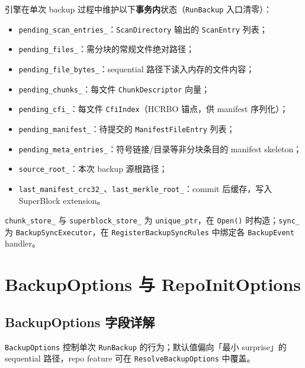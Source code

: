 引擎在单次 backup 过程中维护以下\textbf{事务内}状态（\texttt{RunBackup} 入口清零）：

\begin{structbox}
\begin{itemize}[nosep]
  \item \texttt{pending\_scan\_entries\_}：\texttt{ScanDirectory} 输出的 \texttt{ScanEntry} 列表；
  \item \texttt{pending\_files\_}：需分块的常规文件绝对路径；
  \item \texttt{pending\_file\_bytes\_}：sequential 路径下读入内存的文件内容；
  \item \texttt{pending\_chunks\_}：每文件 \texttt{ChunkDescriptor} 向量；
  \item \texttt{pending\_cfi\_}：每文件 \texttt{CfiIndex}（HCRBO 锚点，供 manifest 序列化）；
  \item \texttt{pending\_manifest\_}：待提交的 \texttt{ManifestFileEntry} 列表；
  \item \texttt{pending\_meta\_entries\_}：符号链接/目录等非分块条目的 manifest skeleton；
  \item \texttt{source\_root\_}：本次 backup 源根路径；
  \item \texttt{last\_manifest\_crc32\_}、\texttt{last\_merkle\_root\_}：commit 后缓存，写入 SuperBlock extension。
\end{itemize}
\end{structbox}

\texttt{chunk\_store\_} 与 \texttt{superblock\_store\_} 为 \texttt{unique\_ptr}，在 \texttt{Open()} 时构造；\texttt{sync\_} 为 \texttt{BackupSyncExecutor}，在 \texttt{RegisterBackupSyncRules} 中绑定各 \texttt{BackupEvent} handler。

\section{BackupOptions 与 RepoInitOptions}
\label{sec:be-options}

\subsection{BackupOptions 字段详解}

\texttt{BackupOptions} 控制单次 \texttt{RunBackup} 的行为；默认值偏向「最小 surprise」的 sequential 路径，repo feature 可在 \texttt{ResolveBackupOptions} 中覆盖。

